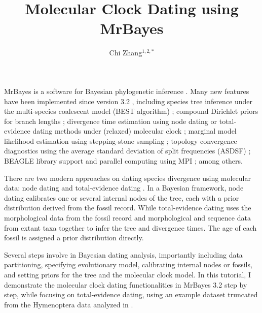 \documentclass[12pt]{article}
\begin{document}
\title{Molecular Clock Dating using MrBayes}
\author{Chi Zhang$^{1,2,*}$}
\maketitle


\newpage 
MrBayes is a software for Bayesian phylogenetic inference \citep{Huelsenbeck:2001jt,Ronquist:2003gt}.
Many new features have been implemented since version 3.2 \citep{Ronquist:2012ir}, 
including species tree inference under the multi-species coalescent model (BEST algorithm) \citep{Liu:2007du};
compound Dirichlet priors for branch lengths \citep{Rannala:2012ke,Zhang:2012ke};
divergence time estimation using node dating \citep{Hedges:2004cl,Yang:2006eu,Ho:2009gn} or total-evidence dating \citep{Ronquist:2012ea,Zhang:2016kf} methods under (relaxed) molecular clock \citep{Huelsenbeck:2000ic,Thorne:2002il,Drummond:2006kt,Lepage:2007bq};
marginal model likelihood estimation using stepping-stone sampling \citep{Xie:2011it};
topology convergence diagnostics using the average standard deviation of split frequencies (ASDSF) \citep{Lakner:2008dn};
BEAGLE library \citep{Ayres:2012gf} support and parallel computing using MPI \citep{Altekar:2004jz}; among others.

There are two modern approaches on dating species divergence using molecular data: node dating \citep[e.g.,][]{Yang:2006eu,Drummond:2006kt} and total-evidence dating \citep[e.g.,][]{Ronquist:2012ea,Zhang:2016kf}.
In a Bayesian framework, node dating calibrates one or several internal nodes of the tree, each with a prior distribution derived from the fossil record. 
While total-evidence dating uses the morphological data from the fossil record and morphological and sequence data from extant taxa together to infer the tree and divergence times. The age of each fossil is assigned a prior distribution directly.

Several steps involve in Bayesian dating analysis, importantly including data partitioning, specifying evolutionary model, calibrating internal nodes or fossils, and setting priors for the tree and the molecular clock model.
In this tutorial, I demonstrate the molecular clock dating functionalities in MrBayes 3.2 step by step, while focusing on total-evidence dating, using an example dataset truncated from the Hymenoptera data analyzed in \citet{Ronquist:2012ea,Zhang:2016kf}. 
\end{document}
